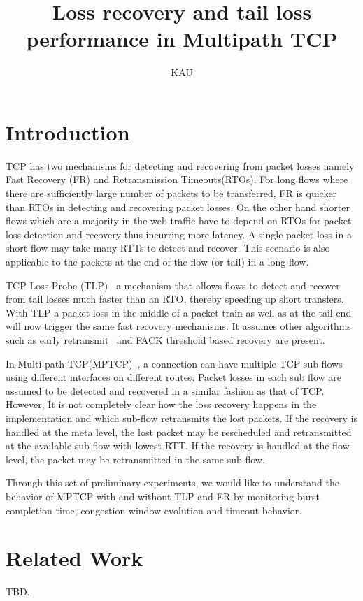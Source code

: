\documentclass[10pt,draftcls,twocolumn]{IEEEconf}
\title{Loss recovery and tail loss performance in Multipath TCP}
\author{KAU}
\begin{document}
\maketitle

\begin{abstract}
\end{abstract}

\section{Introduction}
TCP has two mechanisms for detecting and recovering from packet losses namely Fast Recovery (FR) and Retransmission Timeouts(RTOs). For long flows where there are sufficiently large number of packets 
to be transferred, FR is quicker than RTOs in detecting and recovering packet losses. On the other hand shorter flows which are a majority in the web traffic have to depend on RTOs for packet loss detection 
and recovery thus incurring more latency. A single packet loss in a short flow may take many RTTs to detect and recover. This scenario is also applicable to the packets at the end of the flow (or tail) in a long 
flow.

TCP Loss Probe (TLP)~\cite{ietftlp} a mechanism that allows flows to detect and recover from tail losses much faster than an RTO, thereby speeding up short transfers. With TLP a packet loss in the middle 
of a packet train as well as at the tail end will now trigger the same fast recovery mechanisms. It assumes other algorithms such as early retransmit~\cite{rfc5827} and FACK threshold based recovery are 
present.

In Multi-path-TCP(MPTCP)~\cite{rfc6824}, a connection can have multiple TCP sub flows using different interfaces on different routes. Packet losses in each sub flow are assumed to be detected and recovered 
in a similar fashion as that of TCP. However, It is not completely clear how the loss recovery happens in the implementation and which sub-flow retransmits the lost packets. If the recovery is handled at the 
meta level, the lost packet may be rescheduled and retransmitted at the available sub flow with lowest RTT. If the recovery is handled at the flow level, the packet may be retransmitted in the same sub-flow. 

Through this set of preliminary experiments, we would like to understand the behavior of MPTCP with and without TLP and ER by monitoring burst completion time, congestion window evolution and timeout 
behavior.

\section{Related Work}\label{relwork}
TBD.
\end{document}
